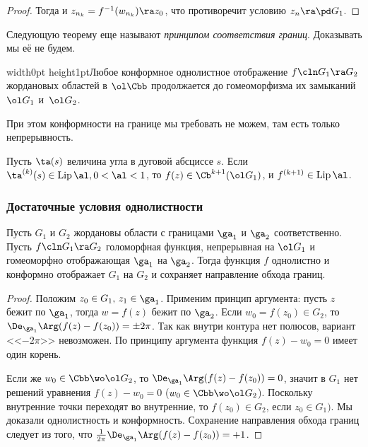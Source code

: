 \documentclass[a4paper]{article}
\def\marksign{$\maltese$}
\newcommand{\markr}{\vrule width0pt height1pt\vadjust{\vbox to 0pt{\vss\hbox to \textwidth{\hfil\raise.1pc\hbox to 0pt{\hskip.75em\marksign\hss}}}}}
\DeclareMathOperator{\Lip}{Lip}
\begin{document}
\begin{theorem}
\begin{proof}
Тогда и $z_{n_k}=f^{-1}(w_{n_k})\ra z_0$, что противоречит условию $z_n \ra \pd G_1$.
\end{proof}

Следующую теорему еще называют \emph{принципом соответствия границ}. Доказывать мы её не будем.
\begin{theorem}[Каратеодори]
\markr Любое конформное однолистное отображение $f\cln G_1\ra G_2$ жордановых областей в $\ol \Cbb$
продолжается до гомеоморфизма их замыканий $\ol G_1$ и~$\ol G_2$.
\end{theorem}

\begin{note}
При этом конформности на границе мы требовать не можем, там есть только непрерывность.
\end{note}

\begin{theorem}[Кэллог]
 Пусть $\ta (s)$ величина угла в дуговой абсциссе $s$.
Если $\ta^{(k)}(s)\in \Lip \al,  0<\al<1$, то $f(z)\in \Cb^{k+1}(\ol G_1)$, и $f^{(k+1)}\in \Lip \al$.
\end{theorem}

\subsubsection{Достаточные условия однолистности}

\begin{theorem}
Пусть $G_1$ и $G_2$ жордановы области с границами $\ga_1$ и $\ga_2$ соответственно. Пусть
$f\cln G_1\ra G_2$ голоморфная функция, непрерывная на $\ol G_1$ и гомеоморфно отображающая $\ga_1$ на $\ga_2$.
Тогда функция $f$ однолистно и конформно отображает $G_1$ на $G_2$ и сохраняет направление обхода границ.
\end{theorem}
\begin{proof}
Положим $z_0\in G_1,\, z_1\in \ga_1$. Применим принцип аргумента: пусть $z$ бежит по $\ga_1$, тогда $w=f(z)$
бежит по $\ga_2$. Если $w_0=f(z_0)\in G_2$, то $\De_{\ga_1}\Arg(f(z)-f(z_0))=\pm 2 \pi$. Так как внутри контура
нет полюсов, вариант <<$-2\pi$>> невозможен. По принципу аргумента функция $f(z)-w_0=0$ имеет один корень.

Если же $w_0\in \Cbb\wo\ol G_2$, то $\De_{\ga_1}\Arg(f(z)-f(z_0))=0$, значит в $G_1$ нет решений уравнения
$f(z)-w_0=0$ ($w_0\in \Cbb\wo\ol G_2$). Поскольку внутренние точки переходят во внутренние, то $f(z_0)\in G_2$,
если $z_0\in G_1)$. Мы доказали однолистность и конформность. Сохранение направления обхода границ
следует из того, что $\frac1{2\pi}\De_{\ga_1}\Arg(f(z)-f(z_0))=+1$.
\end{proof}


\end{theorem}
\end{document}
